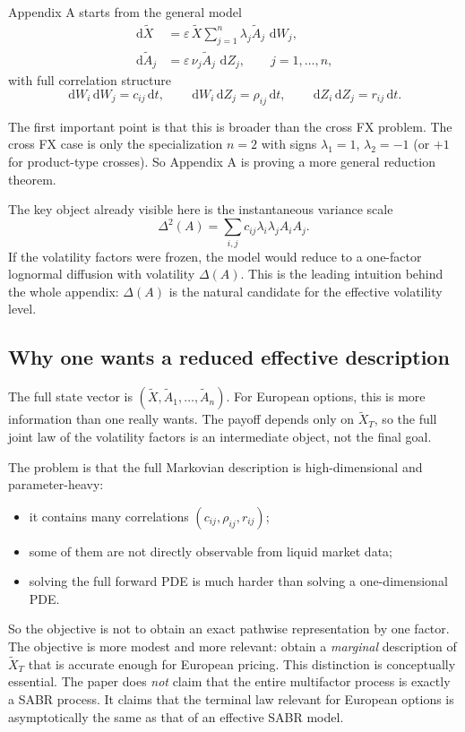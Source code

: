 \documentclass[11pt]{article}
\newcommand{\dd}{\,\mathrm{d}}
\newcommand{\eps}{\varepsilon}
\newcommand{\X}{\widetilde{X}}
\newcommand{\Vol}{\widetilde{A}}
\begin{document}
Appendix A starts from the general model
\begin{align}
\dd \X &= \eps\, \X \sum_{j=1}^n \lambda_j \Vol_j \,\dd W_j, \label{eq:A1a} \\
\dd \Vol_j &= \eps\, \nu_j \Vol_j \,\dd Z_j, \qquad j=1,\dots,n, \label{eq:A1b}
\end{align}
with full correlation structure
\[
\dd W_i\dd W_j=c_{ij}\dd t,\qquad
\dd W_i\dd Z_j=\rho_{ij}\dd t,\qquad
\dd Z_i\dd Z_j=r_{ij}\dd t.
\]

The first important point is that this is broader than the cross FX problem. The cross FX case is only the specialization \(n=2\) with signs \(\lambda_1=1\), \(\lambda_2=-1\) (or \(+1\) for product-type crosses). So Appendix A is proving a more general reduction theorem.

The key object already visible here is the instantaneous variance scale
\[
\Delta^2(A)=\sum_{i,j} c_{ij}\lambda_i\lambda_j A_iA_j.
\]
If the volatility factors were frozen, the model would reduce to a one-factor lognormal diffusion with volatility \(\Delta(A)\). This is the leading intuition behind the whole appendix: \(\Delta(A)\) is the natural candidate for the effective volatility level.

\subsection{Why one wants a reduced effective description}

The full state vector is \((\X,\Vol_1,\dots,\Vol_n)\). For European options, this is more information than one really wants. The payoff depends only on \(\X_T\), so the full joint law of the volatility factors is an intermediate object, not the final goal.

The problem is that the full Markovian description is high-dimensional and parameter-heavy:
\begin{itemize}
    \item it contains many correlations \((c_{ij},\rho_{ij},r_{ij})\);
    \item some of them are not directly observable from liquid market data;
    \item solving the full forward PDE is much harder than solving a one-dimensional PDE.
\end{itemize}

So the objective is not to obtain an exact pathwise representation by one factor. The objective is more modest and more relevant: obtain a \emph{marginal} description of \(\X_T\) that is accurate enough for European pricing. This distinction is conceptually essential. The paper does \emph{not} claim that the entire multifactor process is exactly a SABR process. It claims that the terminal law relevant for European options is asymptotically the same as that of an effective SABR model.
\end{document}
